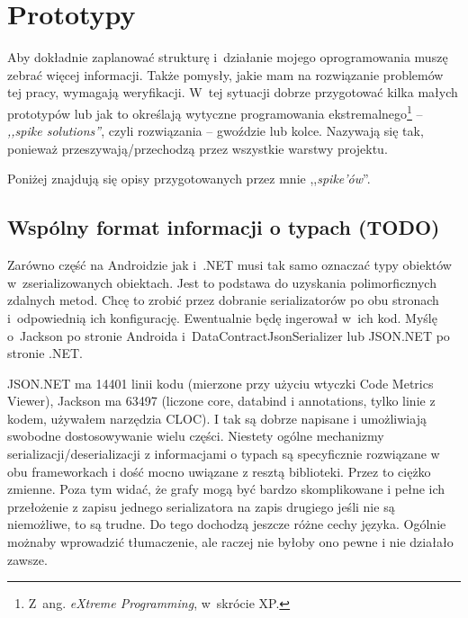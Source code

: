 \section{Prototypy}
Aby dokładnie zaplanować strukturę i~działanie mojego oprogramowania muszę zebrać więcej informacji.
Także pomysły, jakie mam na rozwiązanie problemów tej pracy, wymagają weryfikacji.
W~tej sytuacji dobrze przygotować kilka małych prototypów lub jak to określają wytyczne programowania ekstremalnego\footnote{Z~ang. \emph{eXtreme Programming}, w~skrócie XP.} -- \emph{,,spike solutions''}, czyli rozwiązania -- gwoździe lub kolce\cite{spike}. Nazywają się tak, ponieważ przeszywają/przechodzą przez wszystkie warstwy projektu.

Poniżej znajdują się opisy przygotowanych przez mnie ,,\emph{spike'ów}''.

\subsection{Wspólny format informacji o typach (TODO)}
Zarówno część na Androidzie jak i~.NET musi tak samo oznaczać typy obiektów w~zserializowanych obiektach.
Jest to podstawa do uzyskania polimorficznych zdalnych metod.
Chcę to zrobić przez dobranie serializatorów po obu stronach i~odpowiednią ich konfigurację. Ewentualnie będę ingerował w~ich kod.
Myślę o~Jackson po stronie Androida i~DataContractJsonSerializer lub JSON.NET po stronie .NET\@.


JSON.NET ma 14401 linii kodu (mierzone przy użyciu wtyczki Code Metrics Viewer), Jackson ma 63497 (liczone core, databind i annotations, tylko linie z kodem, używałem narzędzia CLOC). I tak są dobrze napisane i umożliwiają swobodne dostosowywanie wielu części. Niestety ogólne mechanizmy serializacji/deserializacji z informacjami o typach są specyficznie rozwiązane w obu frameworkach i dość mocno uwiązane z resztą biblioteki. Przez to ciężko zmienne.
Poza tym widać, że grafy mogą być bardzo skomplikowane i pełne ich przełożenie z zapisu jednego serializatora na zapis drugiego jeśli nie są niemożliwe, to są trudne. Do tego dochodzą jeszcze różne cechy języka.
Ogólnie możnaby wprowadzić tłumaczenie, ale raczej nie byłoby ono pewne i nie działało zawsze.

